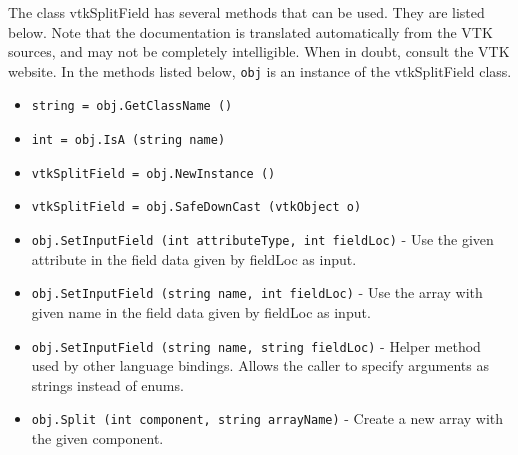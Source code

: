 The class vtkSplitField has several methods that can be used.
  They are listed below.
Note that the documentation is translated automatically from the VTK sources,
and may not be completely intelligible.  When in doubt, consult the VTK website.
In the methods listed below, \verb|obj| is an instance of the vtkSplitField class.
\begin{itemize}
\item  \verb|string = obj.GetClassName ()|

\item  \verb|int = obj.IsA (string name)|

\item  \verb|vtkSplitField = obj.NewInstance ()|

\item  \verb|vtkSplitField = obj.SafeDownCast (vtkObject o)|

\item  \verb|obj.SetInputField (int attributeType, int fieldLoc)| -  Use the  given attribute in the field data given
 by fieldLoc as input.

\item  \verb|obj.SetInputField (string name, int fieldLoc)| -  Use the array with given name in the field data given
 by fieldLoc as input.

\item  \verb|obj.SetInputField (string name, string fieldLoc)| -  Helper method used by other language bindings. Allows the caller to
 specify arguments as strings instead of enums.

\item  \verb|obj.Split (int component, string arrayName)| -  Create a new array with the given component.

\end{itemize}
